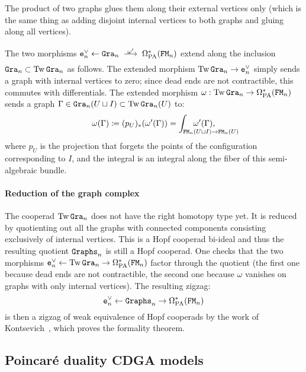 The product of two graphs glues them along their external vertices only (which is the same thing as adding disjoint internal vertices to both graphs and gluing along all vertices).

The two morphisms $\enV \gets \Gra_{n} \tkrightarrow{\omega'} \OmPA^{*}(\FM_{n})$ extend along the inclusion $\mathtt{Gra}_{n} \subset \operatorname{Tw}\mathtt{Gra}_{n}$ as follows.
The extended morphism $\operatorname{Tw}\mathtt{Gra}_{n} \to \mathtt{e}_{n}^{\vee}$ simply sends a graph with internal vertices to zero; since dead ends are not contractible, this commutes with differentials.
The extended morphism $\omega : \operatorname{Tw}\mathtt{Gra}_{n} \to \Omega_{\mathrm{PA}}^{*}(\mathtt{FM}_{n})$ sends a graph $\Gamma \in \mathtt{Gra}_{n}(U \sqcup I) \subset \operatorname{Tw}\mathtt{Gra}_{n}(U)$ to:
\begin{equation}
  \label{cnf.eq:4}
  \omega(\Gamma) \coloneqq (p_{U})_{*}(\omega'(\Gamma)) = \int_{\mathrlap{\FM_{n}(U \sqcup I) \to \FM_{n}(U)}} \quad \omega'(\Gamma),
\end{equation}
where $p_{U}$ is the projection that forgets the points of the configuration corresponding to $I$, and the integral is an integral along the fiber of this semi-algebraic bundle.

\paragraph{Reduction of the graph complex}

The cooperad $\operatorname{Tw}\mathtt{Gra}_{n}$ does not have the right homotopy type yet.
It is reduced by quotienting out all the graphs with connected components consisting exclusively of internal vertices.
This is a Hopf cooperad bi-ideal and thus the resulting quotient $\mathtt{Graphs}_{n}$ is still a Hopf cooperad.
One checks that the two morphisms $\mathtt{e}_{n}^{\vee} \gets \operatorname{Tw}\mathtt{Gra}_{n} \to \Omega_{\mathrm{PA}}^{*}(\mathtt{FM}_{n})$ factor through the quotient (the first one because dead ends are not contractible, the second one because $\omega$ vanishes on graphs with only internal vertices).
The resulting zigzag:
\begin{equation}
  \label{cnf.eq.zigzag-coop}
  \mathtt{e}_{n}^{\vee} \gets \mathtt{Graphs}_{n} \to \Omega_{\mathrm{PA}}^{*}(\mathtt{FM}_{n})
\end{equation}
is then a zigzag of weak equivalence of Hopf cooperads by the work of Kontsevich~\cite{Kontsevich1999}, which proves the formality theorem.

\subsection{Poincaré duality CDGA models}
\label{cnf.sec.poinc-dual-models}

